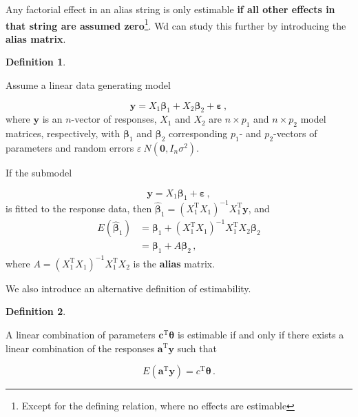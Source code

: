 \documentclass[
]{book}
\theoremstyle{definition}
\newtheorem{definition}{Definition}[chapter]
\theoremstyle{definition}
\theoremstyle{definition}
\theoremstyle{definition}
\theoremstyle{remark}
\begin{document}
Any factorial effect in an alias string is only estimable \textbf{if all other effects in that string are assumed zero}\footnote{Except for the defining relation, where no effects are estimable}. Wd can study this further by introducing the \textbf{alias matrix}.

\begin{definition}
\protect\hypertarget{def:alias-matrix}{}\label{def:alias-matrix}

Assume a linear data generating model

\[
\boldsymbol{y}= X_1\boldsymbol{\beta}_1 + X_2\boldsymbol{\beta}_2 + \boldsymbol{\varepsilon}\,,
\]
where \(\boldsymbol{y}\) is an \(n\)-vector of responses, \(X_1\) and \(X_2\) are \(n\times p_1\) and \(n\times p_2\) model matrices, respectively, with \(\boldsymbol{\beta}_1\) and \(\boldsymbol{\beta}_2\) corresponding \(p_1\)- and \(p_2\)-vectors of parameters and random errors \(\varepsilon ~ N(\boldsymbol{0}, I_n\sigma^2)\).

If the submodel

\[
\boldsymbol{y}= X_1\boldsymbol{\beta}_1 + \boldsymbol{\varepsilon}\,,
\]
is fitted to the response data, then \(\hat{\boldsymbol{\beta}}_1 = (X_1^{\mathrm{T}}X_1)^{-1}X_1^{\mathrm{T}}\boldsymbol{y}\), and
\begin{align*}
E(\hat{\boldsymbol{\beta}}_1) & = \boldsymbol{\beta}_1 + (X_1^{\mathrm{T}}X_1)^{-1}X_1^{\mathrm{T}}X_2\boldsymbol{\beta}_2 \\
& = \boldsymbol{\beta}_1 + A\boldsymbol{\beta}_2\,,
\end{align*}
where \(A = (X_1^{\mathrm{T}}X_1)^{-1}X_1^{\mathrm{T}}X_2\) is the \textbf{alias} matrix.

\end{definition}

We also introduce an alternative definition of estimability.

\begin{definition}
\protect\hypertarget{def:alt-estimability}{}\label{def:alt-estimability}

A linear combination of parameters \(\boldsymbol{c}^{\mathrm{T}}\boldsymbol{\theta}\) is estimable if and only if there exists a linear combination of the responses \(\boldsymbol{a}^{\mathrm{T}}\boldsymbol{y}\) such that

\[
E(\boldsymbol{a}^{\mathrm{T}}\boldsymbol{y}) = c^{\mathrm{T}}\boldsymbol{\theta}\,.
\]

\end{definition}
\end{document}
